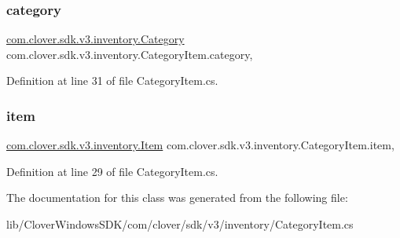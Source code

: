 \subsubsection{\texorpdfstring{category}{category}}
{\footnotesize\ttfamily \hyperlink{classcom_1_1clover_1_1sdk_1_1v3_1_1inventory_1_1_category}{com.\+clover.\+sdk.\+v3.\+inventory.\+Category} com.\+clover.\+sdk.\+v3.\+inventory.\+Category\+Item.\+category\hspace{0.3cm}{\ttfamily [get]}, {\ttfamily [set]}}



Definition at line 31 of file Category\+Item.\+cs.

\mbox{\label{classcom_1_1clover_1_1sdk_1_1v3_1_1inventory_1_1_category_item_aebd9e1e579acd93f92ef14a52da5cd82}} 
\subsubsection{\texorpdfstring{item}{item}}
{\footnotesize\ttfamily \hyperlink{classcom_1_1clover_1_1sdk_1_1v3_1_1inventory_1_1_item}{com.\+clover.\+sdk.\+v3.\+inventory.\+Item} com.\+clover.\+sdk.\+v3.\+inventory.\+Category\+Item.\+item\hspace{0.3cm}{\ttfamily [get]}, {\ttfamily [set]}}



Definition at line 29 of file Category\+Item.\+cs.



The documentation for this class was generated from the following file\+:\begin{DoxyCompactItemize}
\item 
lib/\+Clover\+Windows\+S\+D\+K/com/clover/sdk/v3/inventory/Category\+Item.\+cs\end{DoxyCompactItemize}
